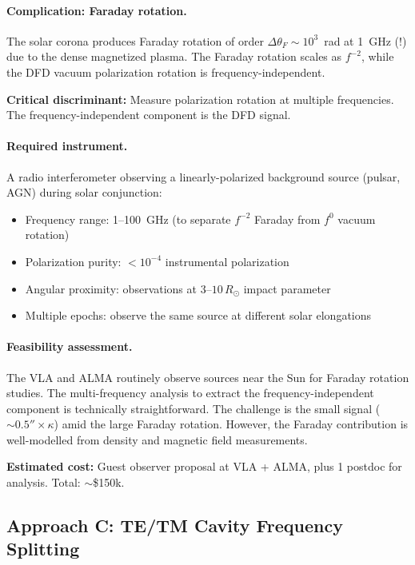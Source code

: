 \documentclass[11pt]{article}
\newcommand{\Rsun}{R_\odot}
\begin{document}
\paragraph{Complication: Faraday rotation.}
The solar corona produces Faraday rotation of order
$\Delta\theta_F \sim 10^3$~rad at 1~GHz (!) due to the dense
magnetized plasma.  The Faraday rotation scales as $f^{-2}$, while
the DFD vacuum polarization rotation is frequency-independent.

\textbf{Critical discriminant:}  Measure polarization rotation at
multiple frequencies.  The frequency-independent component is the
DFD signal.

\paragraph{Required instrument.}
A radio interferometer observing a linearly-polarized background
source (pulsar, AGN) during solar conjunction:
\begin{itemize}[nosep]
\item Frequency range: 1--100~GHz (to separate $f^{-2}$ Faraday
  from $f^0$ vacuum rotation)
\item Polarization purity: $< 10^{-4}$ instrumental polarization
\item Angular proximity: observations at $3$--$10\,\Rsun$ impact
  parameter
\item Multiple epochs: observe the same source at different solar
  elongations
\end{itemize}

\paragraph{Feasibility assessment.}
The VLA and ALMA routinely observe sources near the Sun for
Faraday rotation studies.  The multi-frequency analysis to extract
the frequency-independent component is technically straightforward.
The challenge is the small signal ($\sim 0.5'' \times \kappa$) amid
the large Faraday rotation.  However, the Faraday contribution is
well-modelled from density and magnetic field measurements.

\textbf{Estimated cost:}  Guest observer proposal at VLA + ALMA,
plus 1 postdoc for analysis.  Total: $\sim$\$150k.

\subsection{Approach C: TE/TM Cavity Frequency Splitting}
\end{document}
